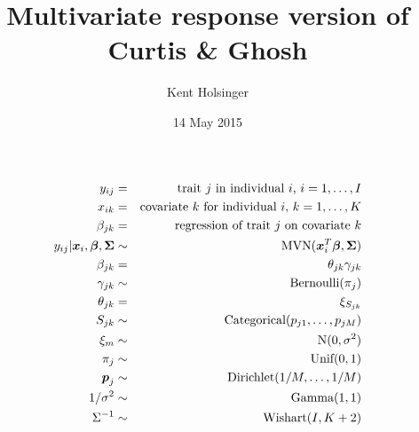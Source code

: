 \documentclass[12pt]{article}
\title{Multivariate response version of Curtis \& Ghosh}
\date{14 May 2015}
\author{Kent Holsinger}
\newcommand{\bmx}{\mbox{\boldmath$x$}}
\newcommand{\bmbeta}{\mbox{\boldmath$\beta$}}
\newcommand{\bmSigma}{\mbox{\boldmath$\Sigma$}}
\newcommand{\bmp}{\mbox{\boldmath$p$}}
\begin{document}
\maketitle

\begin{eqnarray*}
y_{ij} &=& \mbox{trait $j$ in individual $i$, $i = 1,\dots,I$} \\
x_{ik} &=& \mbox{covariate $k$ for individual $i$, $k = 1,\dots,K$} \\ 
\beta_{jk} &=& \mbox{regression of trait $j$ on covariate $k$} \\
y_{ij} | \bmx_i, \bmbeta, \bmSigma &\sim& \mbox{MVN}(\bmx_i^T\bmbeta,
\bmSigma) \\
\beta_{jk} &=& \theta_{jk}\gamma_{jk} \\
\gamma_{jk} &\sim& \mbox{Bernoulli}(\pi_j) \\
\theta_{jk} &=& \xi_{S_{jk}} \\
S_{jk} &\sim& \mbox{Categorical}(p_{j1},\dots,p_{jM}) \\
\xi_m &\sim& \mbox{N}(0, \sigma^2) \\
\pi_j &\sim& \mbox{Unif}(0,1) \\
\bmp_j &\sim& \mbox{Dirichlet}(1/M,\dots,1/M) \\
1/\sigma^2 &\sim& \mbox{Gamma}(1,1) \\
\Sigma^{-1} &\sim& \mbox{Wishart}(I,K+2) 
\end{eqnarray*}
\end{document}
